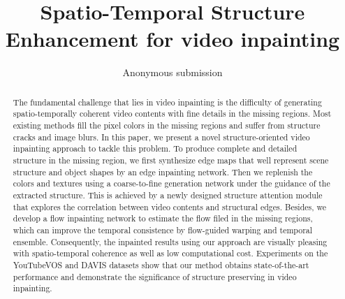 \documentclass[letterpaper]{article} %
\title{Spatio-Temporal Structure Enhancement for video inpainting}
\author{Anonymous submission}
\begin{document}
\maketitle

\begin{abstract}
The fundamental challenge that lies in video inpainting is the difficulty of generating spatio-temporally coherent video contents with fine details in the missing regions. Most existing methods fill the pixel colors in the missing regions and suffer from structure cracks and image blurs. In this paper, we present a novel structure-oriented video inpainting approach to tackle this problem. To produce complete and detailed structure in the missing region, we first synthesize edge maps that well represent scene structure and object shapes by an edge inpainting network. Then we replenish the colors and textures using a coarse-to-fine generation network under the guidance of the extracted structure. This is achieved by a newly designed structure attention module that explores the correlation between video contents and structural edges. 
%
Besides, we develop a flow inpainting network to estimate the flow filed in the missing regions, which can improve the temporal consistence by flow-guided warping and temporal ensemble. Consequently, the inpainted results using our approach are visually pleasing with spatio-temporal coherence as well as low computational cost. Experiments on the YouTubeVOS and DAVIS datasets show that our method obtains state-of-the-art performance and demonstrate the significance of structure preserving in video inpainting.
	
\end{abstract}


 






 

 
\end{document}
